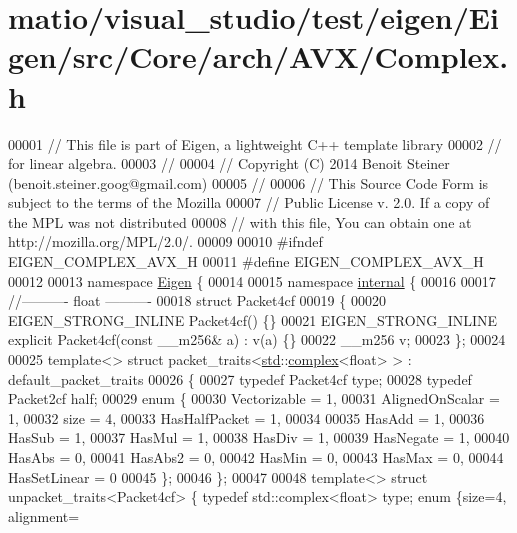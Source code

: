 \hypertarget{matio_2visual__studio_2test_2eigen_2_eigen_2src_2_core_2arch_2_a_v_x_2_complex_8h_source}{}\section{matio/visual\+\_\+studio/test/eigen/\+Eigen/src/\+Core/arch/\+A\+V\+X/\+Complex.h}
\label{matio_2visual__studio_2test_2eigen_2_eigen_2src_2_core_2arch_2_a_v_x_2_complex_8h_source}

\begin{DoxyCode}
00001 \textcolor{comment}{// This file is part of Eigen, a lightweight C++ template library}
00002 \textcolor{comment}{// for linear algebra.}
00003 \textcolor{comment}{//}
00004 \textcolor{comment}{// Copyright (C) 2014 Benoit Steiner (benoit.steiner.goog@gmail.com)}
00005 \textcolor{comment}{//}
00006 \textcolor{comment}{// This Source Code Form is subject to the terms of the Mozilla}
00007 \textcolor{comment}{// Public License v. 2.0. If a copy of the MPL was not distributed}
00008 \textcolor{comment}{// with this file, You can obtain one at http://mozilla.org/MPL/2.0/.}
00009 
00010 \textcolor{preprocessor}{#ifndef EIGEN\_COMPLEX\_AVX\_H}
00011 \textcolor{preprocessor}{#define EIGEN\_COMPLEX\_AVX\_H}
00012 
00013 \textcolor{keyword}{namespace }\hyperlink{namespace_eigen}{Eigen} \{
00014 
00015 \textcolor{keyword}{namespace }\hyperlink{namespaceinternal}{internal} \{
00016 
00017 \textcolor{comment}{//---------- float ----------}
00018 \textcolor{keyword}{struct }Packet4cf
00019 \{
00020   EIGEN\_STRONG\_INLINE Packet4cf() \{\}
00021   EIGEN\_STRONG\_INLINE \textcolor{keyword}{explicit} Packet4cf(\textcolor{keyword}{const} \_\_m256& a) : v(a) \{\}
00022   \_\_m256  v;
00023 \};
00024 
00025 \textcolor{keyword}{template}<> \textcolor{keyword}{struct }packet\_traits<\hyperlink{namespacestd}{std}::\hyperlink{structcomplex}{complex}<float> >  : default\_packet\_traits
00026 \{
00027   \textcolor{keyword}{typedef} Packet4cf type;
00028   \textcolor{keyword}{typedef} Packet2cf half;
00029   \textcolor{keyword}{enum} \{
00030     Vectorizable = 1,
00031     AlignedOnScalar = 1,
00032     size = 4,
00033     HasHalfPacket = 1,
00034 
00035     HasAdd    = 1,
00036     HasSub    = 1,
00037     HasMul    = 1,
00038     HasDiv    = 1,
00039     HasNegate = 1,
00040     HasAbs    = 0,
00041     HasAbs2   = 0,
00042     HasMin    = 0,
00043     HasMax    = 0,
00044     HasSetLinear = 0
00045   \};
00046 \};
00047 
00048 \textcolor{keyword}{template}<> \textcolor{keyword}{struct }unpacket\_traits<Packet4cf> \{ \textcolor{keyword}{typedef} std::complex<float> type; \textcolor{keyword}{enum} \{size=4, alignment=

\end{DoxyCode}
